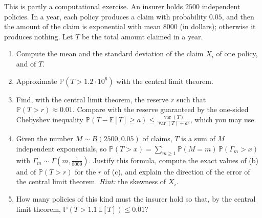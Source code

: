 \begin{exercise}\label{ex:ct-insurance}
\hard This is partly a computational exercise. An insurer holds $2500$ independent policies. In a
year, each policy produces a claim with probability $0.05$, and then the amount of the claim is
exponential with mean $8000$ (in dollars); otherwise it produces nothing. Let $T$ be the total amount
claimed in a year.
\begin{enumerate}[label=(\alph*)]
  \item Compute the mean and the standard deviation of the claim $X_i$ of one policy, and of $T$.
  \item Approximate $\mathbb P(T>1.2\cdot10^6)$ with the central limit theorem.
  \item Find, with the central limit theorem, the reserve $r$ such that $\mathbb P(T>r)\approx0.01$.
    Compare with the reserve guaranteed by the one-sided Chebyshev inequality
    $\mathbb P(T-\mathbb E[T]\ge a)\le\frac{\operatorname{var}(T)}{\operatorname{var}(T)+a^2}$, which you may use.
  \item Given the number $M\sim B(2500,0.05)$ of claims, $T$ is a sum of $M$ independent exponentials,
    so $\mathbb P(T>x)=\sum_{m\ge1}\mathbb P(M=m)\,\mathbb P(\Gamma_m>x)$ with
    $\Gamma_m\sim\Gamma(m,\frac1{8000})$. Justify this formula, compute the exact values of (b) and of
    $\mathbb P(T>r)$ for the $r$ of (c), and explain the direction of the error of the central limit
    theorem. \emph{Hint:} the skewness of $X_i$.
  \item How many policies of this kind must the insurer hold so that, by the central limit theorem,
    $\mathbb P(T>1.1\,\mathbb E[T])\le0.01$?
\end{enumerate}
\end{exercise}
